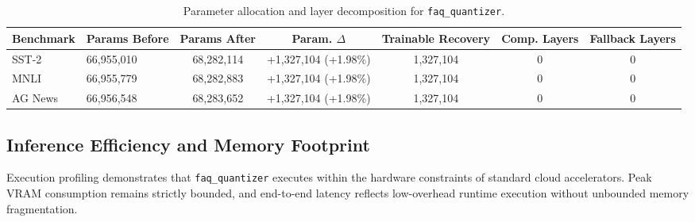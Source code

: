 \begin{table}[t]
\centering
\small
\begin{tabular}{llccccc}
\toprule
\textbf{Benchmark} & \textbf{Params Before} & \textbf{Params After} & \textbf{Param. $\Delta$} & \textbf{Trainable Recovery} & \textbf{Comp. Layers} & \textbf{Fallback Layers} \\
\midrule
SST-2 & 66,955,010 & 68,282,114 & +1,327,104 (+1.98\%) & 1,327,104 & 0 & 0 \\
MNLI & 66,955,779 & 68,282,883 & +1,327,104 (+1.98\%) & 1,327,104 & 0 & 0 \\
AG News & 66,956,548 & 68,283,652 & +1,327,104 (+1.98\%) & 1,327,104 & 0 & 0 \\
\bottomrule
\end{tabular}
\caption{Parameter allocation and layer decomposition for \texttt{faq\_quantizer}.}
\label{tab:params_faq_quantizer}
\end{table}

\subsection{Inference Efficiency and Memory Footprint}
Execution profiling demonstrates that \texttt{faq\_quantizer} executes within the hardware constraints of standard cloud accelerators. Peak VRAM consumption remains strictly bounded, and end-to-end latency reflects low-overhead runtime execution without unbounded memory fragmentation.
